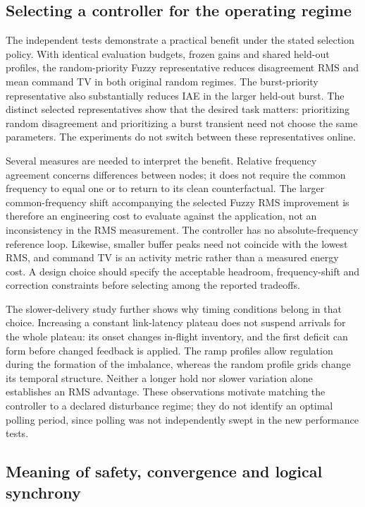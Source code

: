 \subsection{Selecting a controller for the operating regime}
\label{detail:subsec:discussion_selection}

The independent tests demonstrate a practical benefit under the stated
selection policy. With identical evaluation budgets, frozen gains and
shared held-out profiles, the random-priority Fuzzy representative
reduces disagreement RMS and mean command TV in both original random
regimes. The burst-priority representative also substantially reduces
IAE in the larger held-out burst. The distinct selected representatives
show that the desired task matters: prioritizing random disagreement
and prioritizing a burst transient need not choose the same parameters.
The experiments do not switch between these representatives online.

Several measures are needed to interpret the benefit. Relative
frequency agreement concerns differences between nodes; it does not
require the common frequency to equal one or to return to its clean
counterfactual. The larger common-frequency shift accompanying the
selected Fuzzy RMS improvement is therefore an engineering cost to
evaluate against the application, not an inconsistency in the RMS
measurement. The controller has no absolute-frequency reference loop.
Likewise, smaller buffer peaks need not coincide with the lowest RMS,
and command TV is an activity metric rather than a measured energy
cost. A design choice should specify the acceptable headroom,
frequency-shift and correction constraints before selecting among the
reported tradeoffs.

The slower-delivery study further shows why timing conditions belong
in that choice. Increasing a constant link-latency plateau does not
suspend arrivals for the whole plateau: its onset changes in-flight
inventory, and the first deficit can form before changed feedback is
applied. The ramp profiles allow regulation during the formation of
the imbalance, whereas the random profile grids change its temporal
structure. Neither a longer hold nor slower variation alone establishes
an RMS advantage. These observations motivate matching the controller
to a declared disturbance regime; they do not identify an optimal
polling period, since polling was not independently swept in the new
performance tests.

\subsection{Meaning of safety, convergence and logical synchrony}
\label{detail:subsec:discussion_scope}

